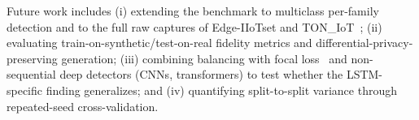 ﻿\documentclass[journal]{IEEEtran}
\begin{document}
Future work includes (i) extending the benchmark to multiclass per-family detection and to the full raw captures of Edge-IIoTset and TON\_IoT~\cite{ferrag2022edgeiiotset,alsaedi2020toniot}; (ii) evaluating train-on-synthetic/test-on-real fidelity metrics and differential-privacy-preserving generation; (iii) combining balancing with focal loss~\cite{dina2023focal} and non-sequential deep detectors (CNNs, transformers) to test whether the LSTM-specific finding generalizes; and (iv) quantifying split-to-split variance through repeated-seed cross-validation.



\end{document}
